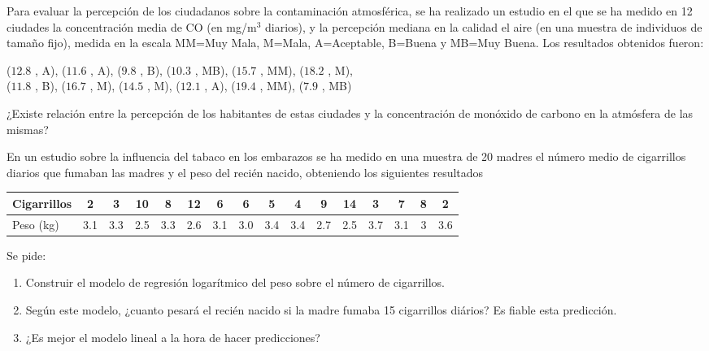 {Para evaluar la percepción de los ciudadanos sobre la contaminación atmosférica, se ha realizado un estudio en el que se ha medido en 12 ciudades la concentración media de CO (en mg/m$^3$ diarios), y la percepción mediana en la calidad el aire (en una muestra de individuos de tamaño fijo), medida en la escala MM=Muy Mala, M=Mala, A=Aceptable, B=Buena y MB=Muy Buena.
Los resultados obtenidos fueron:
\begin{center}
($12.8$ , A), ($11.6$ , A), ($9.8$ , B), ($10.3$ , MB), ($15.7$ , MM), ($18.2$ , M),\\
($11.8$ , B), ($16.7$ , M), ($14.5$ , M), ($12.1$ , A), ($19.4$ , MM), ($7.9$ , MB)
\end{center}
¿Existe relación entre la percepción de los habitantes de estas ciudades y la concentración de monóxido de carbono en la atmósfera de las mismas?
}
{}
{}


{En un estudio sobre la influencia del tabaco en los embarazos se ha medido en una muestra de 20 madres el número medio de cigarrillos diarios que fumaban las madres y el peso del recién nacido, obteniendo los siguientes resultados
\begin{center}
\begin{tabular}{|l|c|c|c|c|c|c|c|c|c|c|c|c|c|c|c|}
\hline
Cigarrillos &  2  &  3  & 10  &  8  & 12  &  6  &  6  &  5  &  4  &  9  & 14  &  3  &  7  & 8 &  2  \\
\hline
Peso (kg)  & 3.1 & 3.3 & 2.5 & 3.3 & 2.6 & 3.1 & 3.0 & 3.4 & 3.4 & 2.7 & 2.5 & 3.7 & 3.1 & 3 & 3.6 \\
\hline
\end{tabular}
\end{center}

Se pide:
\begin{enumerate}
\item Construir el modelo de regresión logarítmico del peso sobre el número de cigarrillos.
\item Según este modelo, ¿cuanto pesará el recién nacido si la madre fumaba 15 cigarrillos diários?
Es fiable esta predicción.
\item ¿Es mejor el modelo lineal a la hora de hacer predicciones?
\end{enumerate}
}
{}
{}


